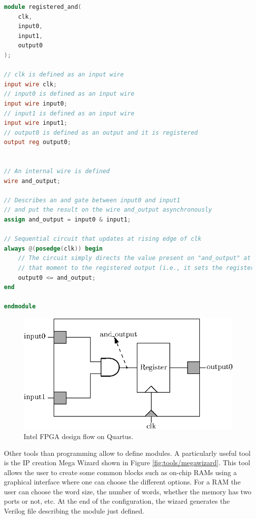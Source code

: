 {\small
\begin{lstlisting}[language=Verilog, caption=Verilog Registered AND gate example.]
module registered_and(
    clk,
    input0,
    input1,
    output0
);

// clk is defined as an input wire 
input wire clk;   
// input0 is defined as an input wire  
input wire input0;  
// input1 is defined as an input wire
input wire input1; 
// output0 is defined as an output and it is registered
output reg output0; 


// An internal wire is defined
wire and_output;    

// Describes an and gate between input0 and input1
// and put the result on the wire and_output asynchronously
assign and_output = input0 & input1; 

// Sequential circuit that updates at rising edge of clk
always @(posedge(clk)) begin
    // The circuit simply directs the value present on "and_output" at 
    // that moment to the registered output (i.e., it sets the register).
    output0 <= and_output;                      
end

endmodule
\end{lstlisting}}

\begin{figure}[H]
    \centering
    \includegraphics[scale=1.0]{Chapter2-FPGA_Flow/res/register_and}
    \caption{Intel FPGA design flow on Quartus.}
    \label{fig:verilog/register_and}
\end{figure}

Other tools than programming allow to define modules. A particularly useful tool is the IP creation 
Mega Wizard shown in Figure \ref{fig:tools/megawizard}. This tool allows the user to create some common 
blocks such as on-chip RAMs using a graphical interface where one can choose the different options. 
For a RAM the user can choose the word size, the number of words, whether the memory has 
two ports or not, etc. At the end of the configuration, the wizard generates the Verilog file 
describing the module just defined.

